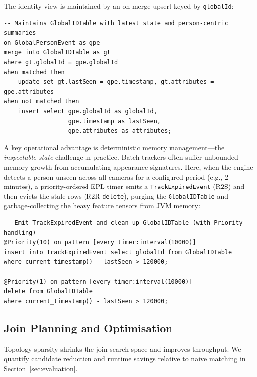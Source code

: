 \documentclass[review]{elsarticle}
\begin{document}
The identity view is maintained by an on-merge upsert keyed by \texttt{globalId}:
\begin{verbatim}
-- Maintains GlobalIDTable with latest state and person-centric summaries
on GlobalPersonEvent as gpe
merge into GlobalIDTable as gt
where gt.globalId = gpe.globalId
when matched then
    update set gt.lastSeen = gpe.timestamp, gt.attributes = gpe.attributes
when not matched then
    insert select gpe.globalId as globalId,
                  gpe.timestamp as lastSeen,
                  gpe.attributes as attributes;
\end{verbatim}

A key operational advantage is deterministic memory management---the \emph{inspectable-state} challenge in practice. Batch trackers often suffer unbounded memory growth from accumulating appearance signatures. Here, when the engine detects a person unseen across all cameras for a configured period (e.g., 2 minutes), a priority-ordered EPL timer emits a \texttt{TrackExpiredEvent} (R2S) and then evicts the stale rows (R2R \texttt{delete}), purging the \texttt{GlobalIDTable} and garbage-collecting the heavy feature tensors from JVM memory:
\begin{verbatim}
-- Emit TrackExpiredEvent and clean up GlobalIDTable (with Priority handling)
@Priority(10) on pattern [every timer:interval(10000)]
insert into TrackExpiredEvent select globalId from GlobalIDTable
where current_timestamp() - lastSeen > 120000;

@Priority(1) on pattern [every timer:interval(10000)]
delete from GlobalIDTable
where current_timestamp() - lastSeen > 120000;
\end{verbatim}

\subsection{Join Planning and Optimisation}
\label{sec:multi:joinplan}
Topology sparsity shrinks the join search space and improves throughput. We quantify candidate reduction and runtime savings relative to naive matching in Section~\ref{sec:evaluation}.
\end{document}
